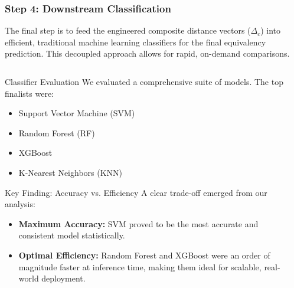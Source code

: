 \documentclass[aspectratio=169,10pt]{beamer}
\begin{document}
\begin{frame}
    \frametitle{Step 4: Downstream Classification}
    
    The final step is to feed the engineered composite distance vectors (\(\Delta_c\)) into efficient, traditional machine learning classifiers for the final equivalency prediction. This decoupled approach allows for rapid, on-demand comparisons.
    
    \fontsize{9}{9}\selectfont
    \begin{columns}[T]
        \begin{column}{0.8\textwidth}
            \begin{block}{Classifier Evaluation}
                We evaluated a comprehensive suite of models. The top finalists were:
                \begin{itemize}
                    \item Support Vector Machine (SVM)
                    \item Random Forest (RF)
                    \item XGBoost
                    \item K-Nearest Neighbors (KNN)
                \end{itemize}
            \end{block}
            
            \vspace{-2mm}

            \begin{alertblock}{Key Finding: Accuracy vs. Efficiency}
                A clear trade-off emerged from our analysis:
                \begin{itemize}
                    \item \textbf{Maximum Accuracy:} SVM proved to be the most accurate and consistent model statistically.
                    \item \textbf{Optimal Efficiency:} Random Forest and XGBoost were an order of magnitude faster at inference time, making them ideal for scalable, real-world deployment.
                \end{itemize}
            \end{alertblock}
        \end{column}
        
        \begin{column}{0.15\textwidth}
            

\end{column}
\end{columns}
\end{frame}
\end{document}
